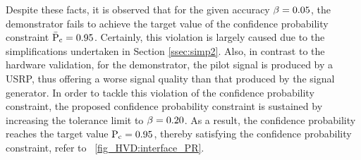 %
%		
%

Despite these facts, it is observed that for the given accuracy $\beta = 0.05$, the demonstrator fails to achieve the target value of the confidence probability constraint $\bar{\text{P}}_{\text{c}} = 0.95$. Certainly, this violation is largely caused due to the simplifications undertaken in Section \ref{ssec:simp2}. 
Also, in contrast to the hardware validation, for the demonstrator, the pilot signal is produced by a USRP, thus offering a worse signal quality than that produced by the signal generator. 
In order to tackle this violation of the confidence probability constraint, the proposed confidence probability constraint is sustained by increasing the tolerance limit to $\beta = 0.20$. 
As a result, the confidence probability reaches the target value $\text{P}_{\text{c}} = 0.95$, thereby satisfying the confidence probability constraint, refer to \figurename~\ref{fig_HVD:interface_PR}. 


